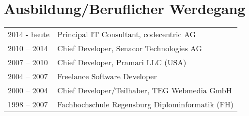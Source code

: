 \section*{Ausbildung/Beruflicher Werdegang}
\begin{longtable}{@{}p{6cm}p{10cm}}
2014 - heute 	& Principal IT Consultant, codecentric AG \\
2010 – 2014 	& Chief Developer, Senacor Technologies AG \\
2007 – 2010 	& Chief Developer, Pramari LLC (USA) \\
2004 – 2007	& Freelance Software Developer \\
2000 – 2004	& Chief Developer/Teilhaber, TEG Webmedia GmbH \\
1998 – 2007	& Fachhochschule Regensburg Diplominformatik (FH) \\
\end{longtable}

